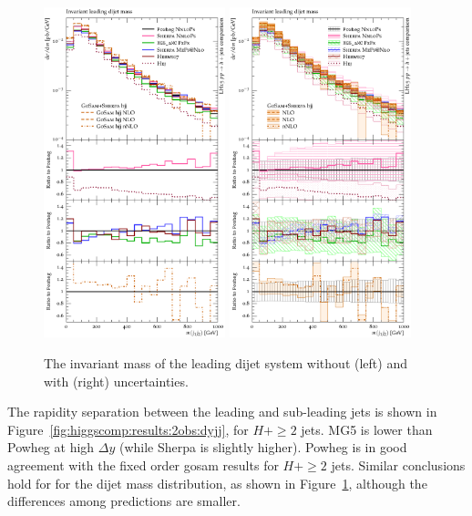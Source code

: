 \begin{figure}[t!]
  \centering
  \includegraphics[width=0.47\textwidth]{figures/hjetscomp_u_dijet_mass.pdf}
  \hfill
  \includegraphics[width=0.47\textwidth]{figures/hjetscomp_dijet_mass.pdf}
  \caption{
    The invariant mass of the leading dijet system without (left) and
    with (right) uncertainties.
    \label{fig:higgscomp:results:2obs:mjj}
  }
\end{figure}

The rapidity separation between the leading and sub-leading jets is
shown in Figure~\ref{fig:higgscomp:results:2obs:dyjj}, for $H+\ge2$
jets. MG5 is lower than Powheg at high $\Delta y$ (while Sherpa is
slightly higher).  Powheg is in good agreement with the fixed order
gosam results for $H+\ge2$ jets. Similar conclusions hold for for the
dijet mass distribution, as shown in
Figure~\ref{fig:higgscomp:results:2obs:mjj}, although the differences
among predictions are smaller.

